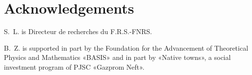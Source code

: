 \documentclass[a4paper,11pt]{article}
\begin{document}
\section*{Acknowledgements}

S.~L. is Directeur de recherches du F.R.S.-FNRS.

B.~Z. is supported in part by the Foundation for the Advancement of Theoretical Physics and Mathematics «BASIS» and in part by «Native towns», a social investment program of PJSC «Gazprom Neft».

{}

\end{document}
